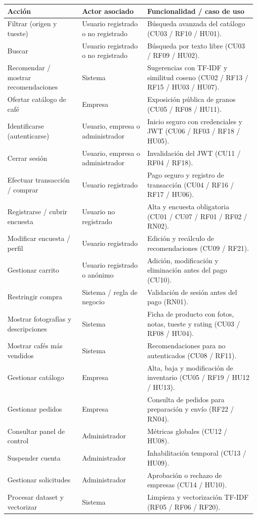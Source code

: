 \begin{longtable}{p{4.3cm}p{4.2cm}p{6.3cm}}
\hline\textbf{Acción}&\textbf{Actor asociado}&\textbf{Funcionalidad / caso de uso}\\\hline
Filtrar (origen y tueste)&Usuario registrado o no registrado&Búsqueda avanzada del catálogo (CU03 / RF10 / HU01).\\
Buscar&Usuario registrado o no registrado&Búsqueda por texto libre (CU03 / RF09 / HU02).\\
Recomendar / mostrar recomendaciones&Sistema&Sugerencias con TF-IDF y similitud coseno (CU02 / RF13 / RF15 / HU03 / HU07).\\
Ofertar catálogo de café&Empresa&Exposición pública de granos (CU05 / RF08 / HU11).\\
Identificarse (autenticarse)&Usuario, empresa o administrador&Inicio seguro con credenciales y JWT (CU06 / RF03 / RF18 / HU05).\\
Cerrar sesión&Usuario, empresa o administrador&Invalidación del JWT (CU11 / RF04 / RF18).\\
Efectuar transacción / comprar&Usuario registrado&Pago seguro y registro de transacción (CU04 / RF16 / RF17 / HU06).\\
Registrarse / cubrir encuesta&Usuario no registrado&Alta y encuesta obligatoria (CU01 / CU07 / RF01 / RF02 / RN02).\\
Modificar encuesta / perfil&Usuario registrado&Edición y recálculo de recomendaciones (CU09 / RF21).\\
Gestionar carrito&Usuario registrado o anónimo&Adición, modificación y eliminación antes del pago (CU10).\\
Restringir compra&Sistema / regla de negocio&Validación de sesión antes del pago (RN01).\\
Mostrar fotografías y descripciones&Sistema&Ficha de producto con fotos, notas, tueste y rating (CU03 / RF08 / HU04).\\
Mostrar cafés más vendidos&Sistema&Recomendaciones para no autenticados (CU08 / RF11).\\
Gestionar catálogo&Empresa&Alta, baja y modificación de inventario (CU05 / RF19 / HU12 / HU13).\\
Gestionar pedidos&Empresa&Consulta de pedidos para preparación y envío (RF22 / RN04).\\
Consultar panel de control&Administrador&Métricas globales (CU12 / HU08).\\
Suspender cuenta&Administrador&Inhabilitación temporal (CU13 / HU09).\\
Gestionar solicitudes&Administrador&Aprobación o rechazo de empresas (CU14 / HU10).\\
Procesar dataset y vectorizar&Sistema&Limpieza y vectorización TF-IDF (RF05 / RF06 / RF20).\\
\hline
\end{longtable}
